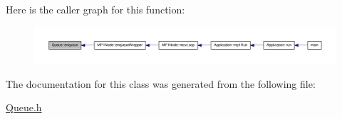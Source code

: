 \-Here is the caller graph for this function\-:
\nopagebreak
\begin{figure}[H]
\begin{center}
\leavevmode
\includegraphics[width=350pt]{d4/da4/class_queue_ae5ad57305adbae74caedbfadefe6c643_icgraph}
\end{center}
\end{figure}




\-The documentation for this class was generated from the following file\-:\begin{DoxyCompactItemize}
\item 
\hyperlink{_queue_8h}{\-Queue.\-h}\end{DoxyCompactItemize}
